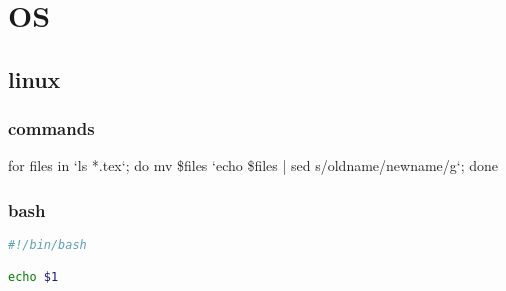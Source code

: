\chapter{OS}
\section{linux}
\subsection{commands}
for files in `ls *.tex`; do mv \$files `echo \$files | sed s/oldname/newname/g`; done
\subsection{bash}
\begin{lstlisting}[language=sh]
#!/bin/bash

echo $1
\end{lstlisting}
